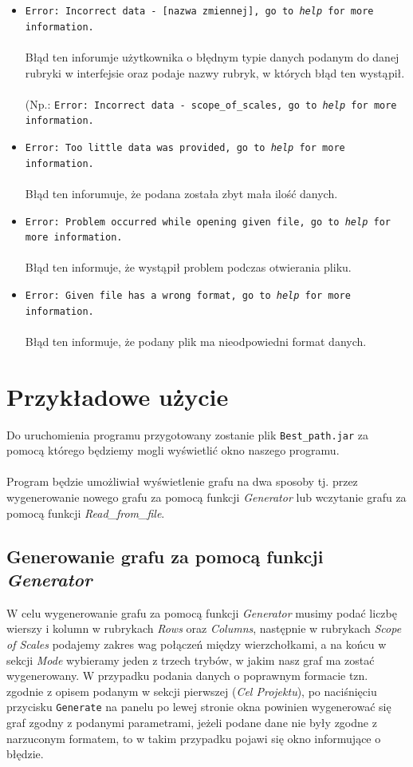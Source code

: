 \documentclass[12pt, a4paper]{article}
\begin{document}
\begin{itemize}
\item \texttt{Error: Incorrect data \-- [nazwa zmiennej], go to \textit{help} for more information.}\\\\
Błąd ten inforumje użytkownika o błędnym typie danych podanym do danej rubryki w interfejsie oraz podaje nazwy rubryk, w których błąd ten wystąpił.\\\\
(Np.: \texttt{Error: Incorrect data \–- scope\_of\_scales, go to \textit{help} for more information.}\\


\item \texttt{Error: Too little data was provided, go to \textit{help} for more information.}\\\\
Błąd ten inforumuje, że podana została zbyt mała ilość danych.
\item \texttt{Error: Problem occurred while opening given file, go to \textit{help} for more information.}\\\\
Błąd ten informuje, że wystąpił problem podczas otwierania pliku.
\item \texttt{Error: Given file has a wrong format, go to \textit{help} for more information.}\\\\
Błąd ten informuje, że podany plik ma nieodpowiedni format danych.

\end{itemize}



\section{Przykładowe użycie}
Do uruchomienia programu przygotowany zostanie plik \texttt{Best\_path.jar} za pomocą którego będziemy mogli wyświetlić okno naszego programu.\\\\
Program będzie umożliwiał wyświetlenie grafu na dwa sposoby tj. przez wygenerowanie nowego grafu za pomocą funkcji \textit{Generator} lub wczytanie grafu za pomocą funkcji \textit{Read\_from\_file}.
\subsection{Generowanie grafu za pomocą funkcji \textit{Generator}}
W celu wygenerowanie grafu za pomocą funkcji \textit{Generator} musimy podać liczbę wierszy i kolumn w rubrykach \textit{Rows} oraz \textit{Columns}, następnie w rubrykach \textit{Scope of Scales} podajemy zakres wag połączeń między wierzchołkami, a na końcu w sekcji \textit{Mode} wybieramy jeden z trzech trybów, w jakim nasz graf ma zostać wygenerowany. W przypadku podania danych o poprawnym formacie tzn. zgodnie z opisem podanym w sekcji pierwszej (\textit{Cel Projektu}), po naciśnięciu przycisku \texttt{Generate} na panelu po lewej stronie okna powinien wygenerować się graf zgodny z podanymi parametrami, jeżeli podane dane nie były zgodne z narzuconym formatem, to w takim przypadku pojawi się okno informujące o błędzie.
\end{document}
